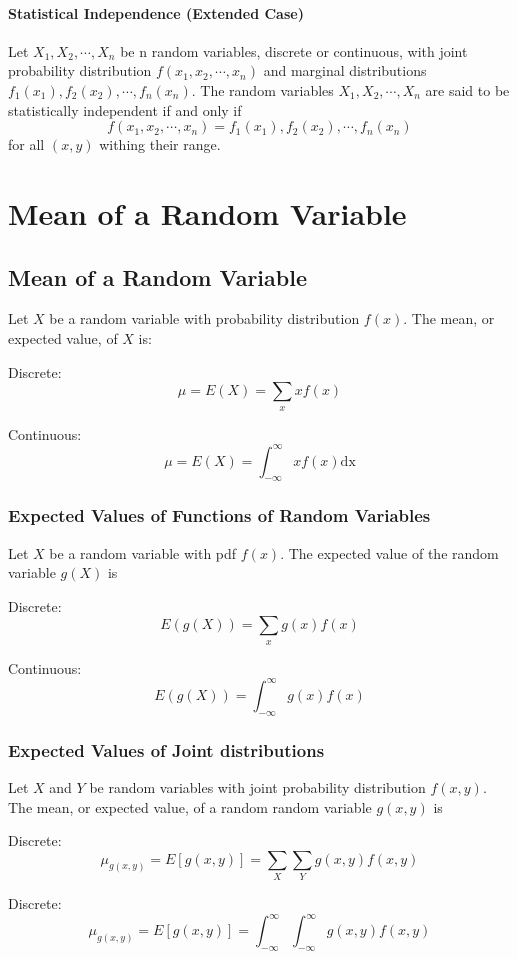 \documentclass{book}
\begin{document}
\subsubsection{Statistical Independence (Extended Case)}
Let $X_1, X_2, \cdots , X_n$ be n random variables, discrete or continuous, with joint probability distribution $f(x_1, x_2, \cdots , x_n)$ and marginal distributions $f_1(x_1), f_2(x_2), \cdots , f_n(x_n)$. The random variables $X_1, X_2, \cdots , X_n$ are said to be statistically independent if and only if
$$f(x_1, x_2, \cdots, x_n) = f_1(x_1), f_2(x_2), \cdots , f_n(x_n)$$
for all $(x,y)$ withing their range.

\chapter{Mean of a Random Variable}

\section{Mean of a Random Variable}
Let $X$ be a random variable with probability distribution $f(x)$. The mean, or expected value, of $X$ is:

Discrete:
	$$\mu = E(X) = \sum_x x f(x)$$ 

Continuous:
	$$\mu = E(X) = \int_{-\infty}^\infty x f(x) \text{dx}$$


\subsection{Expected Values of Functions of Random Variables}

Let $X$ be a random variable with pdf $f(x)$. The expected value of the random variable $g(X)$ is

Discrete:
$$E(g(X))=\sum_x g(x)f(x)$$

Continuous:
$$E(g(X))=\int_{-\infty}^\infty g(x)f(x)$$

\subsection{Expected Values of Joint distributions}
Let $X$ and $Y$ be random variables with joint probability distribution $f(x,y)$. The mean, or expected value, of a random random variable $g(x,y)$ is

Discrete:
$$\mu_{g(x,y)}=E[g(x,y)] = \sum_X \sum_Y g(x,y)f(x,y)$$

Discrete:
$$\mu_{g(x,y)}=E[g(x,y)] = \int_{-\infty}^\infty \int_{-\infty}^\infty g(x,y)f(x,y)$$
\end{document}
